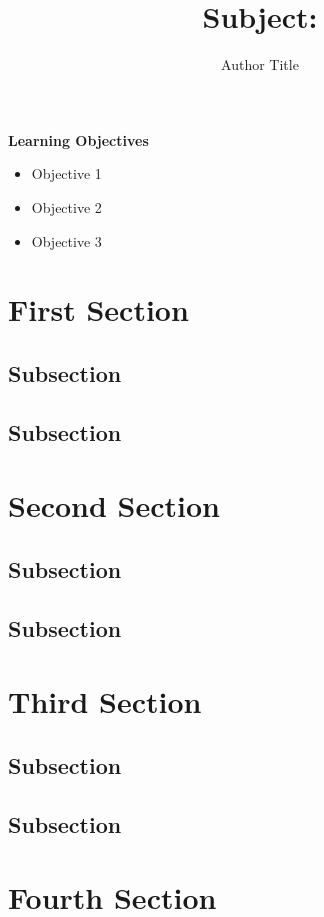\documentclass[10pt,a4paper,twoside]{article}
\author{Author Title}
\title{\textbf{Subject:} }
\begin{document}
\maketitle{} \marginparwidth=4.5cm 

\begin{tcolorbox}\textbf{Learning Objectives}
\begin{itemize}
\item Objective 1
\item Objective 2
\item Objective 3
\end{itemize}
\end{tcolorbox}

\section{First Section}


\subsection{Subsection}
\subsection{Subsection}

\section{Second Section}

\subsection{Subsection}
\subsection{Subsection}

\section{Third Section}

\subsection{Subsection}
\subsection{Subsection}

\section{Fourth Section}
\end{document}

